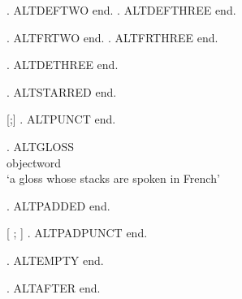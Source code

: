

\ex. ALTDEFTWO  end.
\ex. ALTDEFTHREE  end.

{
 \ex. ALTFRTWO  end.
 \ex. ALTFRTHREE  end.}

{
 \ex. ALTDETHREE  end.}

{
 \ex. ALTSTARRED  end.}

{[;]
 \ex. ALTPUNCT  end.}

{
 \ex. \gll ALTGLOSS \\
      objectword \\
 \glt `a gloss whose stacks are spoken in French'}

{
 \ex. ALTPADDED  end.}

{[ ; ]
 \ex. ALTPADPUNCT  end.}

{\SetAltSpoken{}
 \ex. ALTEMPTY  end.}

\ex. ALTAFTER  end.

